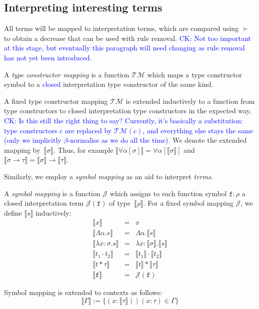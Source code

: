 \documentclass[runningheads,a4paper]{llncs}
\newcommand{\Typemap}{\mathcal{T\!M}}
\newcommand{\Termmap}{\mathcal{J}}
\newcommand{\quant}[2]{\forall #1[#2]}
\newcommand{\typeinterpret}[1]{\llbracket #1 \rrbracket}
\newcommand{\interpret}[1]{\llbracket #1 \rrbracket}
\newcommand{\itp}[1]{\llbracket #1 \rrbracket}
\newcommand{\arrtype}{\rightarrow}
\newcommand{\abs}[2]{\lambda #1.#2}
\newcommand{\tabs}[2]{\Lambda #1.#2}
\newcommand{\app}[2]{#1 \cdot #2}
\newcommand{\tapp}[2]{#1 * #2}
\newcommand{\CK}[1]{\textcolor{blue}{CK: #1}}
\newcommand{\CKchange}[1]{\textcolor{blue}{#1}}
\begin{document}
\subsection{Interpreting interesting terms}

All terms will be mapped to interpretation terms, which are compared
using $\succ$ to obtain a decrease that can be used with
rule removal. \CK{Not too important at this stage, but eventually this
paragraph will need changing as rule removal has not yet been
introduced.}

\begin{definition}\normalfont
A \emph{type constructor mapping} is a function $\Typemap$ which maps
a type constructor symbol to a \CKchange{closed} interpretation type
constructor of the same kind.

A fixed type constructor mapping $\Typemap$ is extended inductively to
a function from type constructors to closed interpretation type
constructors in the expected way.
\CK{Is this still the right thing to say? Currently, it's basically a
substitution: type constructors $c$ are replaced by $\Typemap(c)$, and
everything else stays the same (only we implicitly $\beta$-normalise as
we do all the time).}
We denote the extended mapping
by~$\typeinterpret{\sigma}$. Thus, for example
$\typeinterpret{\quant{\alpha}{\sigma}} =
\quant{\alpha}{\typeinterpret{\sigma}}$ and $\typeinterpret{\sigma
  \arrtype \tau} = \typeinterpret{\sigma} \arrtype
\typeinterpret{\tau}$.
\end{definition}

Similarly, we employ a \emph{symbol mapping} as an aid to interpret
\emph{terms}.

\begin{definition}\normalfont
  A \emph{symbol mapping} is a function $\Termmap$ which assigns to
  each function symbol $\mathtt{f} : \rho$ a closed interpretation
  term $\Termmap(\mathtt{f})$ of type~$\typeinterpret{\rho}$. For a
  fixed symbol mapping $\Termmap$, we define $\interpret{s}$
  inductively:
  \[
    \begin{array}{rcl}
      \interpret{x} & = & x \\
      \interpret{\tabs{\alpha}{s}} & = & \tabs{\alpha}{\interpret{s}} \\
      \interpret{\abs{x:\sigma}{s}} & = & \abs{x:\typeinterpret{\sigma}}{
                                          \interpret{s}} \\
      \interpret{\app{t_1}{t_2}} &=& \app{\interpret{t_1}}{\interpret{t_2}} \\
      \interpret{\tapp{t}{\tau}} &=& \tapp{\interpret{t}}{\typeinterpret{\tau}} \\
      \interpret{\mathtt{f}} &=& \Termmap(\mathtt{f})
    \end{array}
  \]

  Symbol mapping is extended to contexts as follows:
  \[
    \itp{\Gamma} := \{ (x : \typeinterpret{\tau}) \mid (x : \tau) \in \Gamma \}
  \]
\end{definition}
\end{document}

